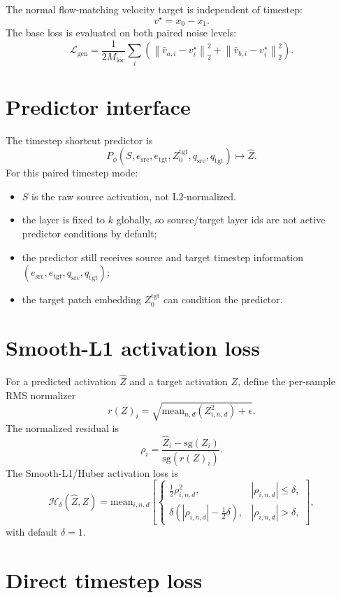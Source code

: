 \documentclass[11pt]{article}
\begin{document}
The normal flow-matching velocity target is independent of timestep:
\[
  v^\star=x_0-x_1.
\]
The base loss is evaluated on both paired noise levels:
\[
  \mathcal{L}_{\mathrm{gen}}
  =
  \frac{1}{2M_{\mathrm{loc}}}
  \sum_i
  \left(
    \left\lVert \hat v_{a,i}-v_i^\star\right\rVert_2^2
    +
    \left\lVert \hat v_{b,i}-v_i^\star\right\rVert_2^2
  \right).
\]

\section{Predictor interface}

The timestep shortcut predictor is
\[
  P_\phi(S,e_{\mathrm{src}},e_{\mathrm{tgt}},Z_0^{\mathrm{tgt}},q_{\mathrm{src}},q_{\mathrm{tgt}})
  \mapsto \widehat Z.
\]
For this paired timestep mode:
\begin{itemize}
\item $S$ is the raw source activation, not L2-normalized.
\item the layer is fixed to $k$ globally, so source/target layer ids are not
  active predictor conditions by default;
\item the predictor still receives source and target timestep information
  $(e_{\mathrm{src}},e_{\mathrm{tgt}},q_{\mathrm{src}},q_{\mathrm{tgt}})$;
\item the target patch embedding $Z_0^{\mathrm{tgt}}$ can condition the
  predictor.
\end{itemize}

\section{Smooth-L1 activation loss}

For a predicted activation $\widehat Z$ and a target activation $Z$, define the
per-sample RMS normalizer
\[
  r(Z)_i =
  \sqrt{\mathrm{mean}_{n,d}\left(Z_{i,n,d}^2\right)+\epsilon}.
\]
The normalized residual is
\[
  \rho_i=\frac{\widehat Z_i-\mathrm{sg}(Z_i)}{\mathrm{sg}(r(Z)_i)}.
\]
The Smooth-L1/Huber activation loss is
\[
  \mathcal{H}_\delta(\widehat Z,Z)
  =
  \mathrm{mean}_{i,n,d}\left[
  \begin{cases}
    \frac{1}{2}\rho_{i,n,d}^2, & |\rho_{i,n,d}|\le \delta,\\
    \delta\left(|\rho_{i,n,d}|-\frac{1}{2}\delta\right),
      & |\rho_{i,n,d}|>\delta,
  \end{cases}
  \right],
\]
with default $\delta=1$.

\section{Direct timestep loss}
\end{document}
